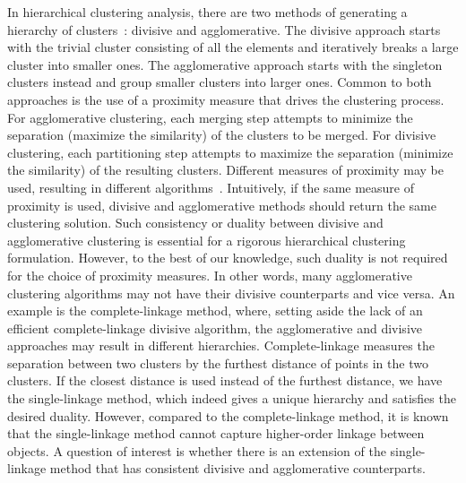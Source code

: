 In hierarchical clustering analysis, there are two methods of generating a hierarchy of clusters~\cite{jain1988algorithms,kaufman2009finding}: divisive and agglomerative. The divisive approach starts with the trivial cluster consisting of all the elements and iteratively breaks a large cluster into smaller ones. The agglomerative approach starts with the singleton clusters instead and group smaller clusters into larger ones. Common to both approaches is the use of a proximity measure that drives the clustering process. For agglomerative clustering, each merging step attempts to minimize the separation (maximize the similarity) of the clusters to be merged. For divisive clustering, each partitioning step attempts to maximize the separation (minimize the similarity) of the resulting clusters. Different measures of proximity may be used, resulting in different algorithms~\cite{sibson1973slink,defays1977efficient,ward1963hierarchical}. Intuitively, if the same measure of proximity is used, divisive and agglomerative methods should return the same clustering solution. Such consistency or duality between divisive and agglomerative clustering is essential for a rigorous hierarchical clustering formulation. However, to the best of our knowledge, such duality is not required for the choice of proximity measures. In other words, many agglomerative clustering algorithms may not have their divisive counterparts and vice versa. An example is the complete-linkage method, where, setting aside the lack of an efficient complete-linkage divisive algorithm, the agglomerative and divisive approaches may result in different hierarchies. Complete-linkage measures the separation between two clusters by the furthest distance of points in the two clusters. If the closest distance is used instead of the furthest distance, we have the single-linkage method, which indeed gives a unique hierarchy and satisfies the desired duality. However, compared to the complete-linkage method, it is known that the single-linkage method cannot capture higher-order linkage between objects. A question of interest is whether there is an extension of the single-linkage method that has consistent divisive and agglomerative counterparts.


